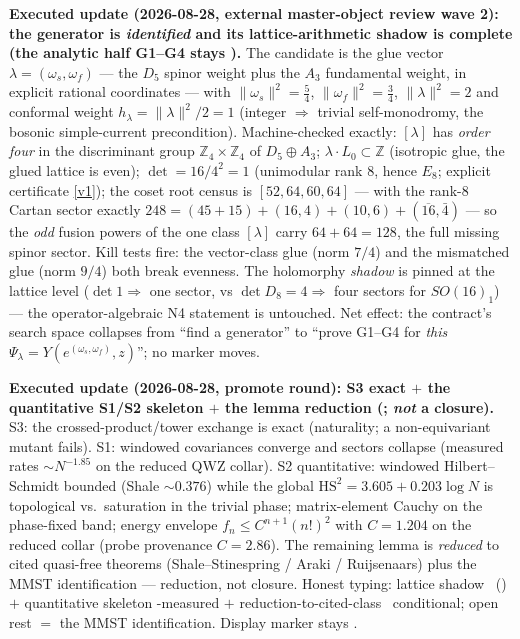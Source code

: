 \par\smallskip\noindent\textbf{Executed update (2026-08-28, external master-object review wave
2): the generator is \emph{identified} and its lattice-arithmetic shadow is complete
(the analytic half G1--G4 stays \mO).}
The
candidate is the glue vector $\lambda=(\omega_s,\omega_f)$ --- the $D_5$ spinor weight plus the
$A_3$ fundamental weight, in explicit rational coordinates --- with
$\|\omega_s\|^2=\tfrac54$, $\|\omega_f\|^2=\tfrac34$, $\|\lambda\|^2=2$ and conformal weight
$h_\lambda=\|\lambda\|^2/2=1$ (integer $\Rightarrow$ trivial self-monodromy, the bosonic
simple-current precondition).  Machine-checked exactly: $[\lambda]$ has \emph{order four} in
the discriminant group $\mathbb Z_4\times\mathbb Z_4$ of $D_5\oplus A_3$; $\lambda\cdot
L_0\subset\mathbb Z$ (isotropic glue, the glued lattice is even); $\det=16/4^2=1$ (unimodular
rank $8$, hence $E_8$; explicit certificate \vref{v1}); the coset root census is
$[52,64,60,64]$ --- with the rank-8 Cartan sector exactly
$248=(45{+}15)+(16,4)+(10,6)+(\overline{16},\bar 4)$ --- so the \emph{odd} fusion powers of the
one class $[\lambda]$ carry $64+64=128$, the full missing spinor sector.  Kill tests fire: the
vector-class glue (norm $7/4$) and the mismatched glue (norm $9/4$) both break evenness.  The
holomorphy \emph{shadow} is pinned at the lattice level ($\det 1\Rightarrow$ one sector, vs
$\det D_8=4\Rightarrow$ four sectors for $SO(16)_1$) --- the operator-algebraic N4 statement
is untouched.  Net effect: the contract's search space collapses from ``find a generator'' to
``prove G1--G4 for \emph{this} $\Psi_\lambda=Y(e^{(\omega_s,\omega_f)},z)$''; no marker moves.

\par\smallskip\noindent\textbf{Executed update (2026-08-28, promote round): S3 exact $+$ the
quantitative S1/S2 skeleton $+$ the lemma reduction
(; \emph{not} a
closure).}
S3: the crossed-product/tower exchange is exact (naturality; a non-equivariant mutant fails).
S1: windowed covariances converge and sectors collapse (measured rates $\sim N^{-1.85}$ on the
reduced QWZ collar).  S2 quantitative: windowed Hilbert--Schmidt bounded (Shale $\sim0.376$)
while the global $\mathrm{HS}^2=3.605+0.203\log N$ is topological vs.\ saturation in the
trivial phase; matrix-element Cauchy on the phase-fixed band; energy envelope
$f_n\le C^{n+1}(n!)^2$ with $C=1.204$ on the reduced collar (probe provenance $C=2.86$).
The remaining lemma is \emph{reduced} to cited quasi-free theorems (Shale--Stinespring / Araki /
Ruijsenaars) plus the MMST identification --- reduction, not closure.  Honest typing: lattice
shadow \mE\ () $+$
quantitative skeleton \mE-measured $+$ reduction-to-cited-class \mC\ conditional; open rest $=$
the MMST identification.  Display marker stays \mO.


